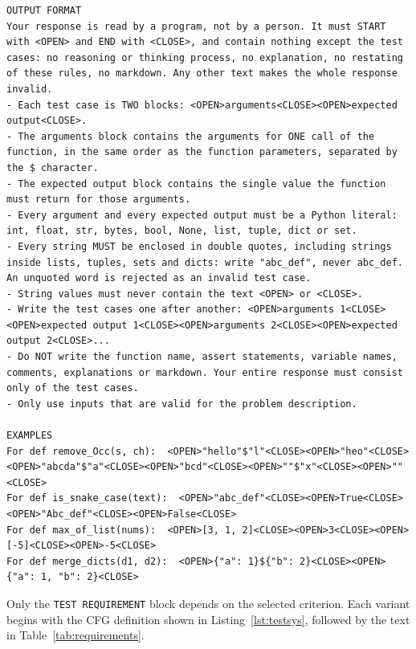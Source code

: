 \documentclass[11pt, a4paper]{article}
\begin{document}
\begin{lstlisting}[style=text, caption={System prompt of the Test Case Generator for prime path coverage}, label={lst:testsys}]
OUTPUT FORMAT
Your response is read by a program, not by a person. It must START with <OPEN> and END with <CLOSE>, and contain nothing except the test cases: no reasoning or thinking process, no explanation, no restating of these rules, no markdown. Any other text makes the whole response invalid.
- Each test case is TWO blocks: <OPEN>arguments<CLOSE><OPEN>expected output<CLOSE>.
- The arguments block contains the arguments for ONE call of the function, in the same order as the function parameters, separated by the $ character.
- The expected output block contains the single value the function must return for those arguments.
- Every argument and every expected output must be a Python literal: int, float, str, bytes, bool, None, list, tuple, dict or set.
- Every string MUST be enclosed in double quotes, including strings inside lists, tuples, sets and dicts: write "abc_def", never abc_def. An unquoted word is rejected as an invalid test case.
- String values must never contain the text <OPEN> or <CLOSE>.
- Write the test cases one after another: <OPEN>arguments 1<CLOSE><OPEN>expected output 1<CLOSE><OPEN>arguments 2<CLOSE><OPEN>expected output 2<CLOSE>...
- Do NOT write the function name, assert statements, variable names, comments, explanations or markdown. Your entire response must consist only of the test cases.
- Only use inputs that are valid for the problem description.

EXAMPLES
For def remove_Occ(s, ch):  <OPEN>"hello"$"l"<CLOSE><OPEN>"heo"<CLOSE><OPEN>"abcda"$"a"<CLOSE><OPEN>"bcd"<CLOSE><OPEN>""$"x"<CLOSE><OPEN>""<CLOSE>
For def is_snake_case(text):  <OPEN>"abc_def"<CLOSE><OPEN>True<CLOSE><OPEN>"Abc_def"<CLOSE><OPEN>False<CLOSE>
For def max_of_list(nums):  <OPEN>[3, 1, 2]<CLOSE><OPEN>3<CLOSE><OPEN>[-5]<CLOSE><OPEN>-5<CLOSE>
For def merge_dicts(d1, d2):  <OPEN>{"a": 1}${"b": 2}<CLOSE><OPEN>{"a": 1, "b": 2}<CLOSE>
\end{lstlisting}

Only the \texttt{TEST REQUIREMENT} block depends on the selected criterion. Each variant begins with the CFG definition shown in Listing~\ref{lst:testsys}, followed by the text in Table~\ref{tab:requirements}.
\end{document}
